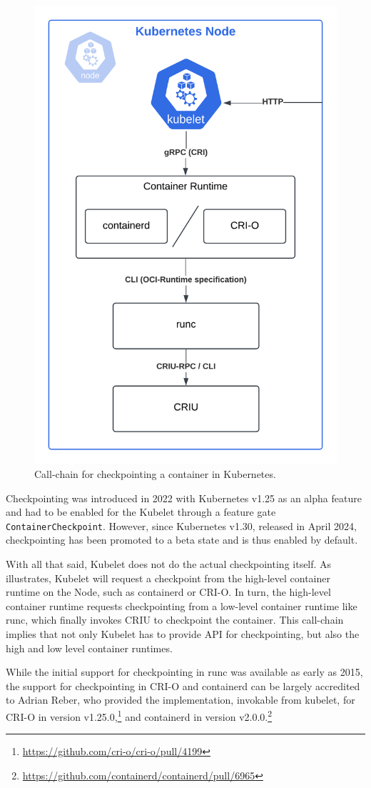 \documentclass[
  digital,     %
  oneside,     %
  nosansbold,  %
  nocolorbold, %
  lof,         %
  nolot,         %
]{fithesis4}
\begin{document}
\begin{figure}[H]
  \begin{center}
  \includegraphics[width=.65\textwidth]{figures/checkpoint-callchain.png}
  \end{center}
  \caption{Call-chain for checkpointing a container in Kubernetes.}
  \label{fig:criu-calltrace}
\end{figure}

Checkpointing was introduced in 2022 with Kubernetes v1.25 as an alpha feature and had to be enabled for the Kubelet through a feature gate \texttt{ContainerCheckpoint}. However, since Kubernetes v1.30, released in April 2024, checkpointing has been promoted to a beta state and is thus enabled by default.


With all that said, Kubelet does not do the actual checkpointing itself. As  illustrates, Kubelet will request a checkpoint from the high-level container runtime on the Node, such as containerd or CRI-O. In turn, the high-level container runtime requests checkpointing from a low-level container runtime like runc, which finally invokes CRIU to checkpoint the container. This call-chain implies that not only Kubelet has to provide API for checkpointing, but also the high and low level container runtimes.

While the initial support for checkpointing in runc was available as early as 2015, the support for checkpointing in CRI-O and containerd can be largely accredited to Adrian Reber, who provided the implementation, invokable from kubelet, for CRI-O in version v1.25.0,\footnote{\url{https://github.com/cri-o/cri-o/pull/4199}} and containerd in version v2.0.0.\footnote{\url{https://github.com/containerd/containerd/pull/6965}}
\end{document}
